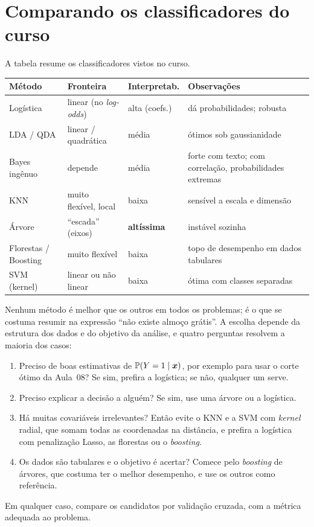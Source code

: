 \documentclass[11pt,a4paper]{article}
\begin{document}
\section{Comparando os classificadores do curso}
A tabela resume os classificadores vistos no curso.
\begin{center}\small
\renewcommand{\arraystretch}{1.3}
\begin{tabular}{@{}l>{\raggedright\arraybackslash}p{3.5cm}>{\raggedright\arraybackslash}p{3.2cm}>{\raggedright\arraybackslash}p{3.6cm}@{}}
\toprule
\textbf{Método} & \textbf{Fronteira} & \textbf{Interpretab.} & \textbf{Observações} \\
\midrule
Logística & linear (no \emph{log-odds}) & alta (coefs.) & dá probabilidades; robusta \\
LDA / QDA & linear / quadrática & média & ótimos sob gaussianidade \\
Bayes ingênuo & depende & média & forte com texto; com correlação, probabilidades extremas \\
KNN & muito flexível, local & baixa & sensível a escala e dimensão \\
Árvore & ``escada'' (eixos) & \textbf{altíssima} & instável sozinha \\
Florestas / Boosting & muito flexível & baixa & topo de desempenho em dados tabulares \\
SVM (kernel) & linear ou não linear & baixa & ótima com classes separadas \\
\bottomrule
\end{tabular}
\end{center}

\begin{ideia}
Nenhum método é melhor que os outros em todos os problemas; é o que se costuma
resumir na expressão ``não existe almoço grátis''. A escolha depende da estrutura dos
dados e do objetivo da análise, e quatro perguntas resolvem a maioria dos casos:
\begin{enumerate}[leftmargin=1.6cm,nosep]
  \item Preciso de boas estimativas de $\mathbb{P}(Y=1\mid\bm{x})$, por exemplo para usar o
        corte ótimo da Aula~08? Se sim, prefira a logística; se não, qualquer um
        serve.
  \item Preciso explicar a decisão a alguém? Se sim, use uma árvore ou a logística.
  \item Há muitas covariáveis irrelevantes? Então evite o KNN e a SVM com
        \emph{kernel} radial, que somam todas as coordenadas na distância, e prefira
        a logística com penalização Lasso, as florestas ou o \emph{boosting}.
  \item Os dados são tabulares e o objetivo é acertar? Comece pelo \emph{boosting}
        de árvores, que costuma ter o melhor desempenho, e use os outros como
        referência.
\end{enumerate}
Em qualquer caso, compare os candidatos por validação cruzada, com a métrica adequada
ao problema.
\end{ideia}
\end{document}
